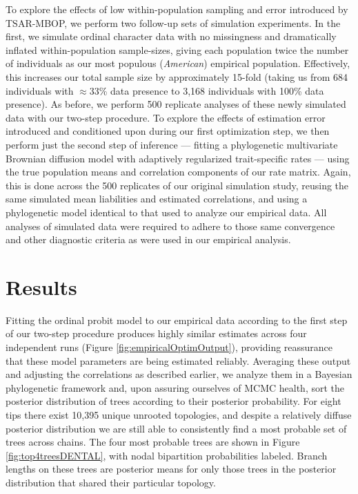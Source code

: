 To explore the effects of low within-population sampling and error introduced by TSAR-MBOP, we perform two follow-up sets of simulation experiments. In the first, we simulate ordinal character data with no missingness and dramatically inflated within-population sample-sizes, giving each population twice the number of individuals as our most populous (\textit{American}) empirical population. Effectively, this increases our total sample size by approximately 15-fold (taking us from 684 individuals with $\approx$33\% data presence to 3,168 individuals with 100\% data presence). As before, we perform 500 replicate analyses of these newly simulated data with our two-step procedure. To explore the effects of estimation error introduced and conditioned upon during our first optimization step, we then perform just the second step of inference --- fitting a phylogenetic multivariate Brownian diffusion model with adaptively regularized trait-specific rates --- using the true population means and correlation components of our rate matrix. Again, this is done across the 500 replicates of our original simulation study, reusing the same simulated mean liabilities and estimated correlations, and using a phylogenetic model identical to that used to analyze our empirical data. All analyses of simulated data were required to adhere to those same convergence and other diagnostic criteria as were used in our empirical analysis.

\clearpage

\section{Results}

Fitting the ordinal probit model to our empirical data according to the first step of our two-step procedure produces highly similar estimates across four independent runs (Figure \ref{fig:empiricalOptimOutput}), providing reassurance that these model parameters are being estimated reliably. Averaging these output and adjusting the correlations as described earlier, we analyze them in a Bayesian phylogenetic framework and, upon assuring ourselves of MCMC health, sort the posterior distribution of trees according to their posterior probability. For eight tips there exist 10,395 unique unrooted topologies, and despite a relatively diffuse posterior distribution we are still able to consistently find a most probable set of trees across chains. The four most probable trees are shown in Figure \ref{fig:top4treesDENTAL}, with nodal bipartition probabilities labeled. Branch lengths on these trees are posterior means for only those trees in the posterior distribution that shared their particular topology. 

